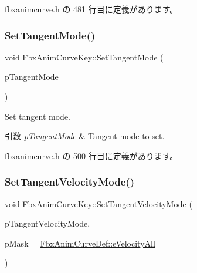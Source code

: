  fbxanimcurve.\+h の 481 行目に定義があります。

\mbox{\label{class_fbx_anim_curve_key_a8a8a090694fc042e9b234e40918faf8e}} 
\subsubsection{\texorpdfstring{Set\+Tangent\+Mode()}{SetTangentMode()}}
{\footnotesize\ttfamily void Fbx\+Anim\+Curve\+Key\+::\+Set\+Tangent\+Mode (\begin{DoxyParamCaption}\item[{\hyperlink{class_fbx_anim_curve_def_ac810ccc5ca0527704ab5175479964b87}{Fbx\+Anim\+Curve\+Def\+::\+E\+Tangent\+Mode}}]{p\+Tangent\+Mode }\end{DoxyParamCaption})\hspace{0.3cm}{\ttfamily [inline]}}

Set tangent mode. 
\begin{DoxyParams}{引数}
{\em p\+Tangent\+Mode} & Tangent mode to set. \\
\hline
\end{DoxyParams}


 fbxanimcurve.\+h の 500 行目に定義があります。

\mbox{\label{class_fbx_anim_curve_key_a758b05baef1e6298833b1ed9e6c11a3e}} 
\subsubsection{\texorpdfstring{Set\+Tangent\+Velocity\+Mode()}{SetTangentVelocityMode()}}
{\footnotesize\ttfamily void Fbx\+Anim\+Curve\+Key\+::\+Set\+Tangent\+Velocity\+Mode (\begin{DoxyParamCaption}\item[{\hyperlink{class_fbx_anim_curve_def_a747576beffa78ab236d2e140da395fff}{Fbx\+Anim\+Curve\+Def\+::\+E\+Velocity\+Mode}}]{p\+Tangent\+Velocity\+Mode,  }\item[{\hyperlink{class_fbx_anim_curve_def_a747576beffa78ab236d2e140da395fff}{Fbx\+Anim\+Curve\+Def\+::\+E\+Velocity\+Mode}}]{p\+Mask = {\ttfamily \hyperlink{class_fbx_anim_curve_def_a747576beffa78ab236d2e140da395fffab8603ba4ecc238f5dee7489b6a0123ee}{Fbx\+Anim\+Curve\+Def\+::e\+Velocity\+All}} }\end{DoxyParamCaption})\hspace{0.3cm}{\ttfamily [inline]}}

